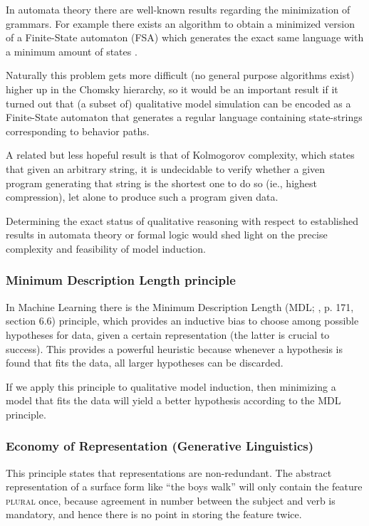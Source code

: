 \documentclass{article} %
\begin{document}
	In automata theory there are well-known results regarding the
	minimization of grammars. For example there exists an algorithm to
	obtain a minimized version of a Finite-State automaton (FSA) which
	generates the exact same language with a minimum amount of states
	\cite{hopcroft}.

	Naturally this problem gets more difficult (no general purpose
	algorithms exist) higher up in the Chomsky hierarchy, so it would be
	an important result if it turned out that (a subset of) qualitative
	model simulation can be encoded as a Finite-State automaton that
	generates a regular language containing state-strings corresponding to
	behavior paths.

	A related but less hopeful result is that of Kolmogorov complexity,
	which states that given an arbitrary string, it is undecidable to
	verify whether a given program generating that string is the shortest
	one to do so (ie., highest compression), let alone to produce such a
	program given data.

	Determining the exact status of qualitative reasoning with respect to
	established results in automata theory or formal logic would shed light
	on the precise complexity and feasibility of model induction.

\subsubsection{Minimum Description Length principle}

	In Machine Learning there is the Minimum Description Length (MDL;
	\cite{mitchell}, p. 171, section 6.6)
	principle, which provides an inductive bias to choose among possible
	hypotheses for data, given a certain representation (the latter is
	crucial to success).  This provides a powerful heuristic because
	whenever a hypothesis is found that fits the data, all larger
	hypotheses can be discarded.
	
	If we apply this principle to qualitative model induction, then
	minimizing a model that fits the data will yield a better hypothesis
	according to the MDL principle.
  
\subsubsection{Economy of Representation (Generative Linguistics)}

	This principle states that representations are non-redundant. The
	abstract representation of a surface form like ``the boys walk'' will
	only contain the feature \textsc{plural} once, because agreement in
	number between the subject and verb is mandatory, and hence there is
	no point in storing the feature twice. 
\end{document}
